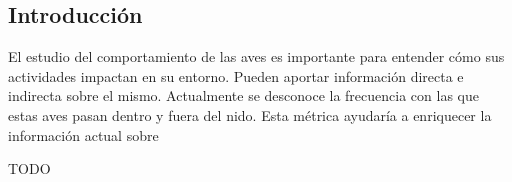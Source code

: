 %

%

\subsection{Introducción}


El estudio del comportamiento de las aves es importante para entender cómo sus actividades impactan en su entorno. Pueden aportar información directa e indirecta sobre el mismo. Actualmente se desconoce la frecuencia con las que estas aves pasan dentro y fuera del nido. Esta métrica ayudaría a enriquecer la información actual sobre 


TODO

%